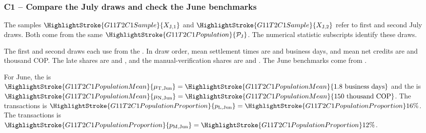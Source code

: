	
	\subsubsection*{C1 -- Compare the July draws and check the June benchmarks}
	\label{sol:c1-settlement-b}

    The samples $\HighlightStroke{G11T2C1Sample}{X_{\mathrm{J},1}}$ and $\HighlightStroke{G11T2C1Sample}{X_{\mathrm{J},2}}$ refer to first and second July draws. Both come from the same $\HighlightStroke{G11T2C1Population}{\mathcal{P}_{\mathrm{J}}}$. The numerical statistic subscripts identify these draws.

	The first and second draws each use  from the  . In draw order, mean settlement times are  and  business days, and mean net credits are  and  thousand COP. The late shares are  and , and the manual-verification shares are  and . The June benchmarks come from  .

	{\raggedright For June, the  is $\HighlightStroke{G11T2C1PopulationMean}{\mu_{\mathrm{T,Jun}}}=\HighlightStroke{G11T2C1PopulationMean}{1.8\text{ business days}}$ and the  is $\HighlightStroke{G11T2C1PopulationMean}{\mu_{\mathrm{N,Jun}}}=\HighlightStroke{G11T2C1PopulationMean}{150\text{ thousand COP}}$.
	The  transactions   is $\HighlightStroke{G11T2C1PopulationProportion}{p_{\mathrm{L,Jun}}}=\HighlightStroke{G11T2C1PopulationProportion}{16\%}$.
	The  transactions   is $\HighlightStroke{G11T2C1PopulationProportion}{p_{\mathrm{M,Jun}}}=\HighlightStroke{G11T2C1PopulationProportion}{12\%}$.\par}

